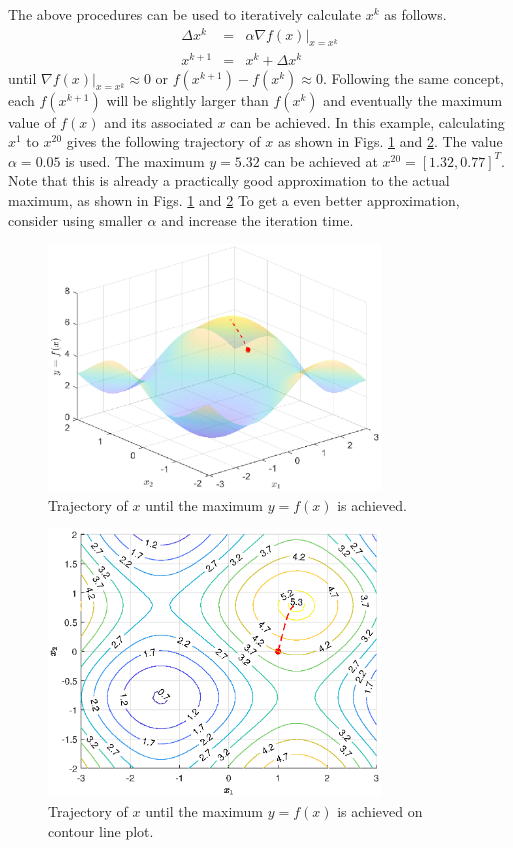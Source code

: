 The above procedures can be used to iteratively calculate $x^k$ as follows.
\begin{eqnarray}
  \Delta x^k &=& \alpha \left.\nabla f(x)\right|_{x=x^k} \nonumber \\
  x^{k+1} &=& x^k + \Delta x^k \nonumber
\end{eqnarray}
until $\left.\nabla f(x)\right|_{x=x^k} \approx 0$ or $f(x^{k+1})-f(x^k) \approx 0$. Following the same concept, each $f(x^{k+1})$ will be slightly larger than $f(x^k)$ and eventually the maximum value of $f(x)$ and its associated $x$ can be achieved. In this example, calculating $x^1$ to $x^{20}$ gives the following trajectory of $x$ as shown in Figs. \ref{ch6fig:gradientexp_3d4} and \ref{ch6fig:gradientexp_3d5}. The value $\alpha = 0.05$ is used. The maximum $y=5.32$ can be achieved at $x^{20} = [1.32, 0.77]^T$. Note that this is already a practically good approximation to the actual maximum, as shown in Figs. \ref{ch6fig:gradientexp_3d4} and \ref{ch6fig:gradientexp_3d5} To get a even better approximation, consider using smaller $\alpha$ and increase the iteration time.

\begin{figure}
	\centering
	\includegraphics[width=250pt]{chapters/chapter6/figures/gradientexp_3d_trajectory.eps}
	\caption{Trajectory of $x$ until the maximum $y=f(x)$ is achieved.} \label{ch6fig:gradientexp_3d4}
\end{figure}

\begin{figure}
	\centering
	\includegraphics[width=250pt]{chapters/chapter6/figures/gradientexp_contour_trajectory.eps}
	\caption{Trajectory of $x$ until the maximum $y=f(x)$ is achieved on contour line plot.} \label{ch6fig:gradientexp_3d5}
\end{figure}

